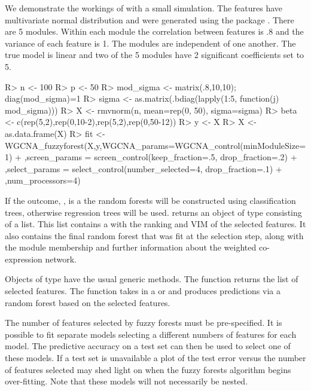 \documentclass[article,shortnames]{jss}
\begin{document}
We demonstrate the workings of  with a small simulation.
The features have multivariate normal distribution and were generated using the package .  
There are 5 modules.  Within each module the correlation between features
is .8 and the variance of each feature is 1.  The modules are independent of one another.
The true model is linear and two of the 5 modules have 2 significant coefficients set to 5.
\begin{CodeChunk}
\begin{CodeInput}
R> n <- 100
R> p <- 50
R> mod_sigma <- matrix(.8,10,10); diag(mod_sigma)=1
R> sigma <- as.matrix(.bdiag(lapply(1:5, function(j) mod_sigma))) 
R> X <- rmvnorm(n, mean=rep(0, 50), sigma=sigma)
R> beta <- c(rep(5,2),rep(0,10-2),rep(5,2),rep(0,50-12))
R> y <- X%
R> X <- as.data.frame(X)
R> fit <- WGCNA_fuzzyforest(X,y,WGCNA_params=WGCNA_control(minModuleSize=1)
+ ,screen_params = screen_control(keep_fraction=.5, drop_fraction=.2)
+ ,select_params = select_control(number_selected=4, drop_fraction=.1) 
+ ,num_processors=4)
\end{CodeInput}
\end{CodeChunk}
If the outcome, , is a  the random forests will be constructed using classification trees,
otherwise regression trees will be used.  returns an  object of type 
 consisting of a list.  This list contains a  with the ranking and VIM 
of the selected features.  It also contains the final random forest that was fit at the selection step, along 
with the module membership and further information about the weighted co-expression network.

Objects of type  have the usual generic methods.  The function  returns the list
of selected features.  The function  takes in a  or 
 and produces predictions via a random forest based on the selected features.  

The number of features selected by fuzzy forests must be pre-specified.  It is possible to fit separate models
selecting a different numbers of features for each model.  The predictive accuracy on a test set can then 
be used to select one of these models.  If a test set is unavailable a plot of the test error versus the number 
of features selected may shed light on when the fuzzy forests algorithm begins over-fitting.
Note that these models will not necessarily be nested.
  
\end{document}
